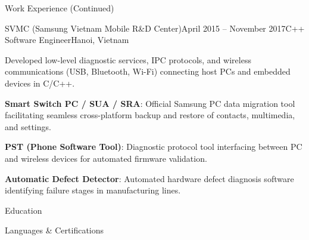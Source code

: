 \documentclass{resume}
\begin{document}
\begin{rSection}{Work Experience (Continued)}
    \begin{rSubsection}{SVMC (Samsung Vietnam Mobile R\&D Center)}{April 2015 -- November 2017}{C++ Software Engineer}{Hanoi, Vietnam}
      \item Developed low-level diagnostic services, IPC protocols, and wireless communications (USB, Bluetooth, Wi-Fi) connecting host PCs and embedded devices in C/C++.
      \rProjectsHeader
      \item \textbf{Smart Switch PC / SUA / SRA}: Official Samsung PC data migration tool facilitating seamless cross-platform backup and restore of contacts, multimedia, and settings.
      \item \textbf{PST (Phone Software Tool)}: Diagnostic protocol tool interfacing between PC and wireless devices for automated firmware validation.
      \item \textbf{Automatic Defect Detector}: Automated hardware defect diagnosis software identifying failure stages in manufacturing lines.
    \end{rSubsection}
  \end{rSection}

  \begin{rSection}{Education}
  \end{rSection}

  \begin{rSection}{Languages \& Certifications}
  \end{rSection}
\end{document}
